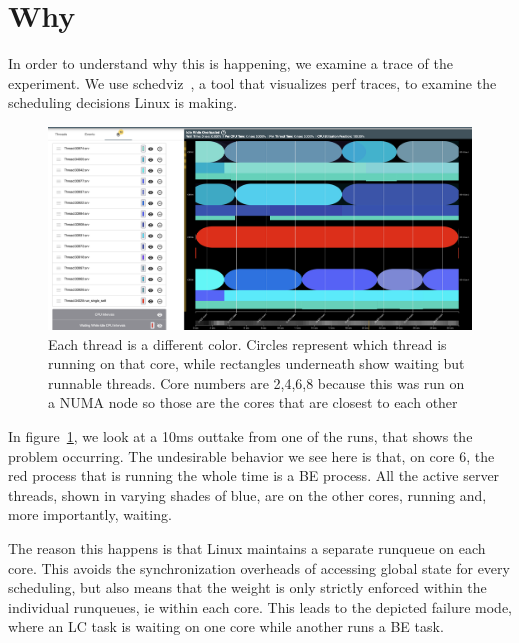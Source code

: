 
\section{Why}
\label{sec:why}

In order to understand why this is happening, we examine a trace of the
experiment. We use schedviz~\cite{schedviz}, a tool that visualizes perf traces,
to examine the scheduling decisions Linux is making.

\begin{figure}[t]
    \centering
    \includegraphics[width=\textwidth]{graphs/schedviz.png}
        \caption{Each thread is a different color. Circles represent which
    thread is running on that core, while rectangles underneath show waiting but
    runnable threads. Core numbers are 2,4,6,8 because this was run on a NUMA
    node so those are the cores that are closest to each other
    }\label{fig:schedviz}
\end{figure}

In figure~\ref{fig:schedviz}, we look at a 10ms outtake from one of the runs,
that shows the problem occurring. The undesirable behavior we see here is that,
on core 6, the red process that is running the whole time is a BE process. All
the active server threads, shown in varying shades of blue, are on the other
cores, running and, more importantly, waiting.

The reason this happens is that Linux maintains a separate runqueue on each
core. This avoids the synchronization overheads of accessing global state for
every scheduling, but also means that the weight is only strictly enforced
within the individual runqueues, ie within each core. This leads to the depicted
failure mode, where an LC task is waiting on one core while another runs a BE
task.

